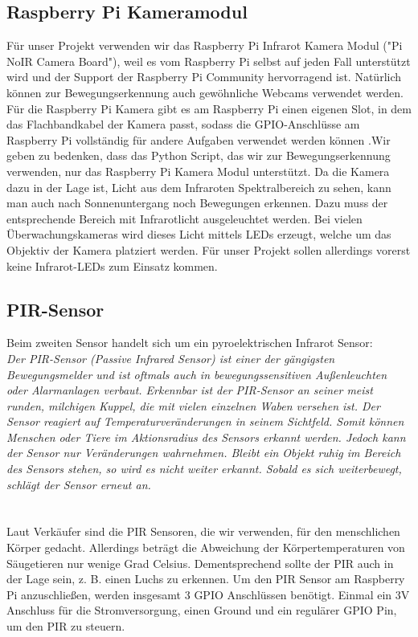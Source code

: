 \documentclass[journal]{IEEEtran}
\begin{document}
\subsection{Raspberry Pi Kameramodul}
Für unser Projekt verwenden wir das Raspberry Pi Infrarot Kamera Modul ("Pi NoIR Camera Board"), weil es vom Raspberry Pi selbst auf jeden Fall unterstützt wird und der Support der Raspberry Pi Community hervorragend ist. Natürlich können zur Bewegungserkennung auch gewöhnliche Webcams verwendet werden. Für die Raspberry Pi Kamera gibt es am Raspberry Pi einen eigenen Slot, in dem das Flachbandkabel der Kamera passt, sodass die GPIO-Anschlüsse am Raspberry Pi vollständig für andere Aufgaben verwendet werden können .Wir geben zu bedenken, dass das Python Script, das wir zur Bewegungserkennung verwenden, nur das Raspberry Pi Kamera Modul unterstützt.  Da die Kamera dazu in der Lage ist, Licht aus dem Infraroten Spektralbereich zu sehen, kann man auch nach Sonnenuntergang noch Bewegungen erkennen. Dazu muss der entsprechende Bereich mit Infrarotlicht ausgeleuchtet werden. Bei vielen Überwachungskameras wird dieses Licht mittels LEDs erzeugt, welche um das Objektiv der Kamera platziert werden. Für unser Projekt sollen allerdings vorerst keine Infrarot-LEDs zum Einsatz kommen.

\subsection{PIR-Sensor}
Beim zweiten Sensor handelt sich um ein pyroelektrischen Infrarot Sensor:\\ \textit{Der PIR-Sensor (Passive Infrared Sensor) ist einer der gängigsten Bewegungsmelder und ist oftmals auch in bewegungssensitiven Außenleuchten oder Alarmanlagen verbaut. Erkennbar ist der PIR-Sensor an seiner meist runden, milchigen Kuppel, die mit vielen einzelnen Waben versehen ist. Der Sensor reagiert auf Temperaturveränderungen in seinem Sichtfeld. Somit können Menschen oder Tiere im Aktionsradius des Sensors erkannt werden. Jedoch kann der Sensor nur Veränderungen wahrnehmen. Bleibt ein Objekt ruhig im Bereich des Sensors stehen, so wird es nicht weiter erkannt.  Sobald es sich weiterbewegt, schlägt der Sensor erneut an.}\cite[S. 493]{Raspi}\\ \\\\ Laut Verkäufer sind die PIR Sensoren, die wir verwenden, für den menschlichen Körper gedacht.  Allerdings beträgt die Abweichung der Körpertemperaturen von Säugetieren nur wenige Grad Celsius. Dementsprechend sollte der PIR auch in der Lage sein, z. B. einen Luchs zu erkennen. Um den PIR Sensor am Raspberry Pi anzuschließen, werden insgesamt 3 GPIO Anschlüssen benötigt. Einmal ein 3V Anschluss für die Stromversorgung, einen Ground und ein regulärer GPIO Pin, um den PIR zu steuern.
\end{document}
